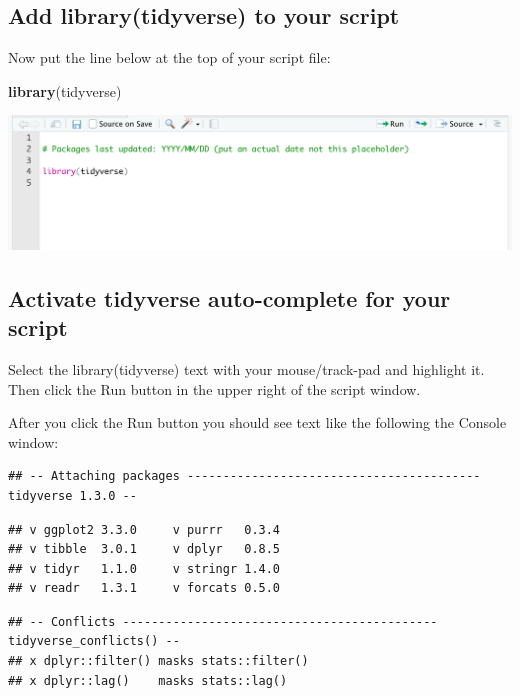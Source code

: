 \documentclass[
]{krantz}
\makeatletter
\newenvironment{Shaded}{\begin{snugshade}}{\end{snugshade}}
\newcommand{\KeywordTok}[1]{\textcolor[rgb]{0.27,0.27,0.27}{\textbf{#1}}}
\newcommand{\NormalTok}[1]{#1}
\newenvironment{kframe}{%
\medskip{}
\setlength{\fboxsep}{.8em}
 \def\at@end@of@kframe{}%
 \ifinner\ifhmode%
  \def\at@end@of@kframe{\end{minipage}}%
  \begin{minipage}{\columnwidth}%
 \fi\fi%
 \def\FrameCommand##1{\hskip\@totalleftmargin \hskip-\fboxsep
 \colorbox{shadecolor}{##1}\hskip-\fboxsep
     \hskip-\linewidth \hskip-\@totalleftmargin \hskip\columnwidth}%
 \MakeFramed {\advance\hsize-\width
   \@totalleftmargin\z@ \linewidth\hsize
   \@setminipage}}%
 {\par\unskip\endMakeFramed%
 \at@end@of@kframe}
\renewenvironment{Shaded}{\begin{kframe}}{\end{kframe}}
\makeatother
\begin{document}
\hypertarget{add-librarytidyverse-to-your-script}{%
\subsection{Add library(tidyverse) to your script}\label{add-librarytidyverse-to-your-script}}

Now put the line below at the top of your script file:

\begin{Shaded}
\begin{Highlighting}[]
\KeywordTok{library}\NormalTok{(tidyverse)}
\end{Highlighting}
\end{Shaded}

\includegraphics[width=0.5\linewidth,height=0.5\textheight]{first_time/images/script_tidyverse}

\hypertarget{activate-tidyverse-auto-complete-for-your-script}{%
\subsection{Activate tidyverse auto-complete for your script}\label{activate-tidyverse-auto-complete-for-your-script}}

Select the library(tidyverse) text with your mouse/track-pad and highlight it. Then click the Run button in the upper right of the script window.

After you click the Run button you should see text like the following the Console window:

\begin{verbatim}
## -- Attaching packages ----------------------------------------- tidyverse 1.3.0 --
\end{verbatim}

\begin{verbatim}
## v ggplot2 3.3.0     v purrr   0.3.4
## v tibble  3.0.1     v dplyr   0.8.5
## v tidyr   1.1.0     v stringr 1.4.0
## v readr   1.3.1     v forcats 0.5.0
\end{verbatim}

\begin{verbatim}
## -- Conflicts -------------------------------------------- tidyverse_conflicts() --
## x dplyr::filter() masks stats::filter()
## x dplyr::lag()    masks stats::lag()
\end{verbatim}
\end{document}
